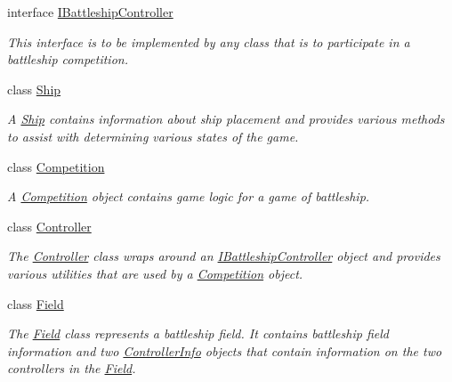 \begin{DoxyCompactItemize}
\item 
interface \hyperlink{interface_m_b_c_1_1_core_1_1_i_battleship_controller}{I\-Battleship\-Controller}
\begin{DoxyCompactList}\small\item\em This interface is to be implemented by any class that is to participate in a battleship competition. \end{DoxyCompactList}\item 
class \hyperlink{class_m_b_c_1_1_core_1_1_ship}{Ship}
\begin{DoxyCompactList}\small\item\em A \hyperlink{class_m_b_c_1_1_core_1_1_ship}{Ship} contains information about ship placement and provides various methods to assist with determining various states of the game. \end{DoxyCompactList}\item 
class \hyperlink{class_m_b_c_1_1_core_1_1_competition}{Competition}
\begin{DoxyCompactList}\small\item\em A \hyperlink{class_m_b_c_1_1_core_1_1_competition}{Competition} object contains game logic for a game of battleship. \end{DoxyCompactList}\item 
class \hyperlink{class_m_b_c_1_1_core_1_1_controller}{Controller}
\begin{DoxyCompactList}\small\item\em The \hyperlink{class_m_b_c_1_1_core_1_1_controller}{Controller} class wraps around an \hyperlink{interface_m_b_c_1_1_core_1_1_i_battleship_controller}{I\-Battleship\-Controller} object and provides various utilities that are used by a \hyperlink{class_m_b_c_1_1_core_1_1_competition}{Competition} object. \end{DoxyCompactList}\item 
class \hyperlink{class_m_b_c_1_1_core_1_1_field}{Field}
\begin{DoxyCompactList}\small\item\em The \hyperlink{class_m_b_c_1_1_core_1_1_field}{Field} class represents a battleship field. It contains battleship field information and two \hyperlink{class_m_b_c_1_1_core_1_1_field_1_1_controller_info}{Controller\-Info} objects that contain information on the two controllers in the \hyperlink{class_m_b_c_1_1_core_1_1_field}{Field}. \end{DoxyCompactList}\item 

\end{DoxyCompactItemize}
